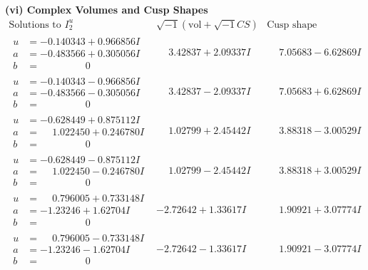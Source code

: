 \documentclass[1p]{elsarticle_modified}
\theoremstyle{definition}
\newcommand{\I}{\sqrt{-1}}
\begin{document}
\newpage\flushleft \textbf{(vi) Complex Volumes and Cusp Shapes}
$$\begin{array}{c|c|c}  
\text{Solutions to }I^u_{2}& \I (\text{vol} + \sqrt{-1}CS) & \text{Cusp shape}\\
 \hline 
\begin{aligned}
u &= -0.140343 + 0.966856 I \\
a &= -0.483566 + 0.305056 I \\
b &= \phantom{-0.000000 } 0\end{aligned}
 & \phantom{-}3.42837 + 2.09337 I & \phantom{-}7.05683 - 6.62869 I \\ \hline\begin{aligned}
u &= -0.140343 - 0.966856 I \\
a &= -0.483566 - 0.305056 I \\
b &= \phantom{-0.000000 } 0\end{aligned}
 & \phantom{-}3.42837 - 2.09337 I & \phantom{-}7.05683 + 6.62869 I \\ \hline\begin{aligned}
u &= -0.628449 + 0.875112 I \\
a &= \phantom{-}1.022450 + 0.246780 I \\
b &= \phantom{-0.000000 } 0\end{aligned}
 & \phantom{-}1.02799 + 2.45442 I & \phantom{-}3.88318 - 3.00529 I \\ \hline\begin{aligned}
u &= -0.628449 - 0.875112 I \\
a &= \phantom{-}1.022450 - 0.246780 I \\
b &= \phantom{-0.000000 } 0\end{aligned}
 & \phantom{-}1.02799 - 2.45442 I & \phantom{-}3.88318 + 3.00529 I \\ \hline\begin{aligned}
u &= \phantom{-}0.796005 + 0.733148 I \\
a &= -1.23246 + 1.62704 I \\
b &= \phantom{-0.000000 } 0\end{aligned}
 & -2.72642 + 1.33617 I & \phantom{-}1.90921 + 3.07774 I \\ \hline\begin{aligned}
u &= \phantom{-}0.796005 - 0.733148 I \\
a &= -1.23246 - 1.62704 I \\
b &= \phantom{-0.000000 } 0\end{aligned}
 & -2.72642 - 1.33617 I & \phantom{-}1.90921 - 3.07774 I \\ \hline\begin{aligned}

\end{aligned}
\end{array}$$
\end{document}
